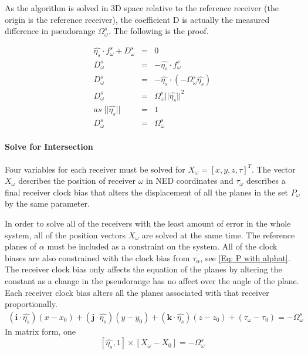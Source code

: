 As the algorithm is solved in 3D space relative to the reference receiver (the origin is the reference receiver), the coefficient D is actually the measured difference in pseudorange $\Omega^s_{\omega}$. The following is the proof.
 
\begin{eqnarray}
\hat{\eta_s}\cdot f_\omega^s + D_\omega^s &=& 0 \label{Eq:solvef}\\
D_\omega^s &=& -\hat{\eta_s}\cdot f_\omega^s \nonumber\\
D_\omega^s &=& -\hat{\eta_s}\cdot (-\Omega_\omega^s\hat{\eta_s}) \nonumber\\
D_\omega^s &=& \Omega_\omega^s ||\hat{\eta_s}||^2 \nonumber\\
as \;||\hat{\eta_s}|| &=& 1 \nonumber\\
D_\omega^s &=& \Omega_\omega^s
\end{eqnarray}


\paragraph{Solve for Intersection}
Four variables for each receiver must be solved for $X_\omega = [x,y,z,\tau]^T$. The vector $X_\omega$ describes the position of receiver $\omega$ in NED coordinates and $\tau_\omega$ describes a final receiver clock bias that alters the displacement of all the planes in the set $P_\omega$ by the same parameter. 

In order to solve all of the receivers with the least amount of error in the whole system, all of the position vectors $X_\omega$ are solved at the same time. The reference planes of $\alpha$ must be included as a constraint on the system. All of the clock biases are also constrained with the clock bias from $\tau_\alpha$, see \eqref{Eq: P with alphat}. The receiver clock bias only affects the equation of the planes by altering the constant as a change in the pseudorange has no affect over the angle of the plane. Each receiver clock bias alters all the planes associated with that receiver proportionally. 
\begin{eqnarray}
(\textbf{i}\cdot\hat{\eta_s})(x-x_0) + (\textbf{j}\cdot\hat{\eta_s})(y-y_0) + (\textbf{k}\cdot\hat{\eta_s})(z-z_0) + (\tau_\omega-\tau_0) = -\Omega_\omega^s \label{Eq: P with alphat}
\end{eqnarray} 
In matrix form, one 
\begin{equation}
 \left[ \hat{\eta_s}, 1 \right] \times [X_\omega - X_0] = -\Omega_\omega^s
\end{equation}

